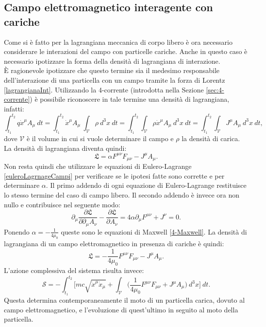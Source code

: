 \subsection{Campo elettromagnetico interagente con cariche}
Come si è fatto per la lagrangiana meccanica di corpo libero è ora necessario considerare le interazioni del campo con particelle cariche. Anche in questo caso è necessario ipotizzare la forma della densità di lagrangiana di interazione.\\
È ragionevole ipotizzare che questo termine sia il medesimo responsabile dell'interazione di una particella con un campo tramite la forza di Lorentz \eqref{lagrangianaInt}. Utilizzando la 4-corrente (introdotta nella Sezione \ref{sec:4-corrente}) è possibile riconoscere in tale termine una densità di lagrangiana, infatti:
\begin{equation*}
    \int_{t_1}^{t_2} q\dot{x}^\mu A_\mu\ dt=\int_{t_1}^{t_2} \dot{x}^\mu A_\mu\ \int_{\mathcal{V} }\rho\ d^3x\ dt=\int_{t_1}^{t_2} \int_{\mathcal{V} }\rho \dot{x}^\mu A_\mu\ d^3x\ dt=\int_{t_1}^{t_2} \int_{\mathcal{V} }J^\mu A_\mu\ d^3x\ dt,
\end{equation*}
dove $\mathcal{V}$ è il volume in cui si vuole determinare il campo e $\rho$ la densità di carica.\\
La densità di lagrangiana diventa quindi:
\begin{equation}
    \mathfrak{L}=\alpha F^{\mu\nu} F_{\mu\nu}-J^\mu A_\mu.
\end{equation}
Non resta quindi che utilizzare le equazioni di Eulero-Lagrange \eqref{euleroLagrnageCampi} per verificare se le ipotesi fatte sono corrette e per determinare $\alpha$. Il primo addendo di ogni equazione di Eulero-Lagrange restituisce lo stesso termine del caso di campo libero. Il secondo addendo è invece ora non nullo e contribuisce nel seguente modo:
\begin{equation*}
    \partial_\mu\frac{\partial\mathfrak{L} }{\partial\partial_\mu A_\nu}-\frac{\partial\mathfrak{L} }{\partial A_\nu}=4\alpha\partial_\mu F^{\mu\nu}+J^\nu=0.
\end{equation*}
Ponendo $\alpha=-\frac{1}{4\mu_0}$ queste sono le equazioni di Maxwell \eqref{4-Maxwell}. La densità di lagrangiana di un campo elettromagnetico in presenza di cariche è quindi:
\begin{equation}
    \mathfrak{L}=-\frac{1}{4\mu_0} F^{\mu\nu} F_{\mu\nu}-J^\mu A_\mu.
\end{equation}
L'azione complessiva del sistema risulta invece:
\begin{equation}
    \mathcal{S} =-\int_{t_1}^{t_2}\bigg[mc\sqrt{\dot x^\mu\dot x_\mu} +\int_{\mathcal{V} }\bigg(\frac{1}{4\mu_0} F^{\mu\nu} F_{\mu\nu}+J^\mu A_\mu\bigg)\ d^3x\bigg]\ dt.
\end{equation}
Questa determina contemporaneamente il moto di un particella carica, dovuto al campo elettromagnetico, e l'evoluzione di quest'ultimo in seguito al moto della particella.
